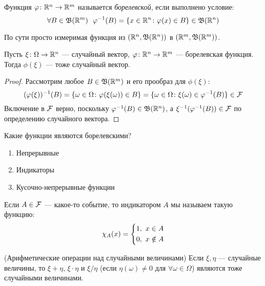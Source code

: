\begin{definition}
	Функция $\varphi \colon \mathbb{R}^n \to \mathbb{R}^m$ называется \textit{борелевской}, если выполнено условие:
	\[
		\forall B \in \mathfrak{B}(\mathbb{R}^m)\ \ \varphi^{-1}(B) = \{x \in \mathbb{R}^n \colon \varphi(x) \in B\} \in \mathfrak{B}(\mathbb{R}^n)
	\]
\end{definition}

\begin{anote}
	По сути просто измеримая функция из $(\mathbb{R}^n, \mathfrak{B}(\mathbb{R}^n))$ в $(\mathbb{R}^m, \mathfrak{B}(\mathbb{R}^m))$.
\end{anote}

\begin{proposition}
	Пусть $\xi \colon \Omega \to \mathbb{R}^n$ --- случайный вектор, $\varphi \colon \mathbb{R}^n \to \mathbb{R}^m$ --- борелевская функция. Тогда $\phi(\xi)$ --- тоже случайный вектор.
\end{proposition}

\begin{proof}
	Рассмотрим любое $B \in \mathfrak{B}(\mathbb{R}^m)$ и его прообраз для $\phi(\xi)$:
	\[
		(\varphi(\xi))^{-1}(B) = \{\omega \in \Omega \colon \varphi(\xi(\omega)) \in B\} = \{\omega \in \Omega \colon \xi(\omega) \in \varphi^{-1}(B)\} \in \mathcal{F}
	\]
	Включение в $\mathcal{F}$ верно, поскольку $\varphi^{-1}(B) \in \mathfrak{B}(\mathbb{R}^n)$, а $\xi^{-1}(\varphi^{-1}(B)) \in \mathcal{F}$ по определению случайного вектора.
\end{proof}

\begin{note}
	Какие функции являются борелевскими?
	\begin{enumerate}
		\item Непрерывные
		
		\item Индикаторы
		
		\item Кусочно-непрерывные функции
	\end{enumerate}
\end{note}

\begin{reminder}
	Если $A \in \mathcal{F}$ --- какое-то событие, то индикатором $A$ мы называем такую функцию:
	\[
		\chi_A(x) = \left\{\begin{aligned}
			&{1,\ x \in A}
			\\
			&{0,\ x \notin A}
		\end{aligned}\right.
	\]
\end{reminder}

\begin{corollary} (Арифметические операции над случайными величинами)
	Если $\xi, \eta$ --- случайные величины, то $\xi + \eta$, $\xi \cdot \eta$ и $\xi / \eta$ (если $\eta(\omega) \neq 0$ для $\forall \omega \in \Omega$) являются тоже случайными величинами.
\end{corollary}


